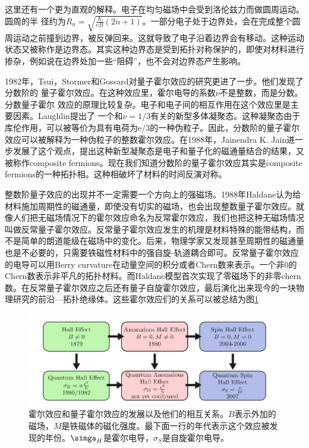 这里还有一个更为直观的解释。电子在均匀磁场中会受到洛伦兹力而做圆周运动。圆周的半
径约为$R_n = \sqrt{\frac{\hbar}{eB}(2 n + 1)}$。一部分电子处于边界处，会在完成整个圆周运动之前撞到边界，被反弹回来。这就导致了电子沿着边界会有移动。这种运动状态又被称作是边界态。其实这种边界态是受到拓扑对称保护的，即使对材料进行掺杂，例如说在边界处加一些“阻碍”，也不会对边界态产生影响。

1982年，Tsui，Stormer和Gossard对量子霍尔效应的研究更进了一步。他们发现了分数阶的
量子霍尔效应\cite{fracHall}。在这种效应里，霍尔电导的系数$\nu$不是整数，而是分数。分数量子霍尔
效应的原理比较复杂。电子和电子间的相互作用在这个效应里是主要因素。Laughlin提出了
一个和$\nu = 1 / 3$有关的新型多体凝聚态\cite{newCondense}。这种凝聚态由于库伦作用，可以被等价为具有电荷为e/3的一种伪粒子。因此，分数阶的量子霍尔效应可以被解释为一种伪粒子的整数霍尔效应。在1988年，Jainendra K. Jain进一步发展了这个观点，提出这种新型凝聚态是电子和量子化的磁通量结合的结果，又被称作composite fermions\cite{compositeF}。现在我们知道分数阶的量子霍尔效应其实是composite fermions的一种拓扑相。这种相破坏了材料的时间反演对称。
  
整数阶量子效应的出现并不一定需要一个方向上的强磁场。1988年Haldane认为给材料施加周期性的磁通量，即使没有切实的磁场，也会出现整数量子霍尔效应\cite{haldane}。就像人们把无磁场情况下的霍尔效应命名为反常霍尔效应，我们也把这种无磁场情况叫做反常量子霍尔效应。反常量子霍尔效应发生的机理是材料特殊的能带结构，而不是简单的朗道能级在磁场中的变化。后来，物理学家又发现甚至周期性的磁通量也是不必要的，只需要铁磁性材料中的强自旋-轨道耦合即可。反常量子霍尔效应的电导可以用Berry curvature在动量空间的积分或者Chern数来表示\cite{anomaQt}。一个非0的Chern数表示非平凡的拓扑材料。而Haldane模型首次实现了零磁场下的非零chern数。在反常量子霍尔效应之后还有量子自旋霍尔效应，最后演化出来现今的一块物理研究的前沿—拓扑绝缘体。这些霍尔效应们的关系可以被总结为图\ref{hallRelation}
  
 \begin {figure}[btp]
\centering 
\includegraphics[width=12cm]{./images/hallRelation.jpg} 
\caption{霍尔效应和量子霍尔效应的发展以及他们的相互关系。$B$表示外加的磁场，$M$是铁磁体的磁化强度。最下面一行的年代表示这个效应被发现的年份。$\simga_H$是霍尔电导，$\sigma_S$是自旋霍尔电导。\cite{}}
\label{hallRelation}
\end {figure} 
  
